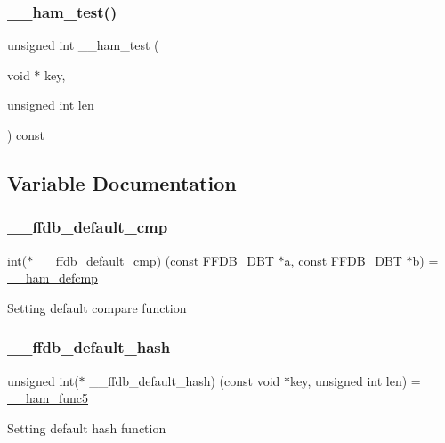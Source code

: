 \subsubsection{\texorpdfstring{\_\_ham\_test()}{\_\_ham\_test()}}
{\footnotesize\ttfamily unsigned int \+\_\+\+\_\+ham\+\_\+test (\begin{DoxyParamCaption}\item[{void $\ast$}]{key,  }\item[{unsigned int}]{len }\end{DoxyParamCaption}) const}



\subsection{Variable Documentation}
\mbox{\label{adat-devel_2other__libs_2filedb_2filehash_2ffdb__hash__func_8c_a95a05878af50da44152ad314a956b048}} 
\subsubsection{\texorpdfstring{\_\_ffdb\_default\_cmp}{\_\_ffdb\_default\_cmp}}
{\footnotesize\ttfamily int($\ast$ \+\_\+\+\_\+ffdb\+\_\+default\+\_\+cmp) (const \mbox{\hyperlink{adat-devel_2other__libs_2filedb_2filehash_2ffdb__db_8h_aa2e0984399491df0fdd20898ca8758f9}{F\+F\+D\+B\+\_\+\+D\+BT}} $\ast$a, const \mbox{\hyperlink{adat-devel_2other__libs_2filedb_2filehash_2ffdb__db_8h_aa2e0984399491df0fdd20898ca8758f9}{F\+F\+D\+B\+\_\+\+D\+BT}} $\ast$b) = \mbox{\hyperlink{adat__devel_2other__libs_2filedb_2filehash_2ffdb__hash__func_8h_a84933d22e6744fb559a08e95010872e6}{\+\_\+\+\_\+ham\+\_\+defcmp}}}

Setting default compare function \mbox{\label{adat-devel_2other__libs_2filedb_2filehash_2ffdb__hash__func_8c_a8dbb63e1cad3f3b74feb88774094ac90}} 
\subsubsection{\texorpdfstring{\_\_ffdb\_default\_hash}{\_\_ffdb\_default\_hash}}
{\footnotesize\ttfamily unsigned int($\ast$ \+\_\+\+\_\+ffdb\+\_\+default\+\_\+hash) (const void $\ast$key, unsigned int len) = \mbox{\hyperlink{adat__devel_2other__libs_2filedb_2filehash_2ffdb__hash__func_8h_a81a42d643c836f388d6dc040e4b9b4c6}{\+\_\+\+\_\+ham\+\_\+func5}}}

Setting default hash function 